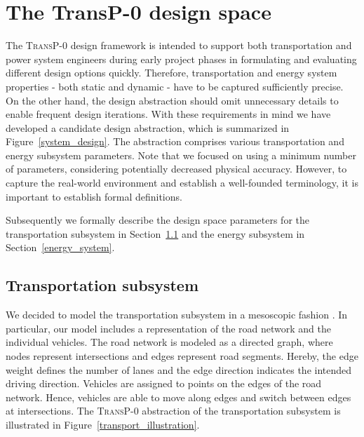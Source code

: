 \section{The \textbf{TransP-0} design space}
\label{proposed_model}
The \textsc{TransP-0} design framework is intended to support both transportation and power system engineers
during early project phases 
in formulating and evaluating different design options quickly. Therefore, transportation and energy system properties - both static and dynamic - have to be captured sufficiently precise. On the other hand, the design abstraction should omit unnecessary details to enable frequent design iterations. With these requirements in mind we have developed a candidate design abstraction, which is summarized in Figure~\ref{system_design}. The abstraction comprises various transportation and energy subsystem parameters. Note that we focused on using a minimum number of parameters, considering potentially decreased physical accuracy. However, to capture the real-world environment and establish a well-founded terminology, it is important to establish formal definitions.


Subsequently we formally describe the design space parameters for the transportation subsystem in Section~\ref{transport} and the energy subsystem in Section~\ref{energy_system}.

\subsection{Transportation subsystem}
\label{transport}

We decided to model the transportation subsystem in a mesoscopic fashion \cite{burghout2005mesoscopic}. In particular, our model includes a representation of the road network and the individual vehicles. The road network is modeled as a directed graph, where nodes represent intersections and edges represent road segments. Hereby, the edge weight defines the number of lanes and the edge direction indicates the intended driving direction.
Vehicles are assigned to points on the edges of the road network. Hence, vehicles are able to move along edges and switch between edges at intersections. The \textsc{TransP-0} abstraction of the transportation subsystem is illustrated in Figure~\ref{transport_illustration}.


